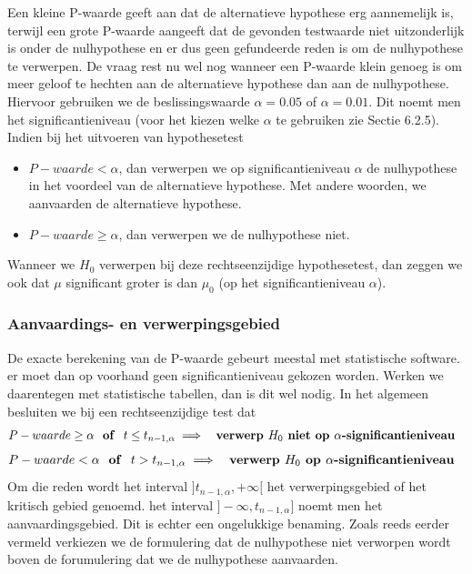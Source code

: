 \documentclass[titlepage]{article}
\numberwithin{equation}{section}
\begin{document}
Een kleine P-waarde geeft aan dat de alternatieve hypothese erg aannemelijk is, terwijl een grote P-waarde aangeeft dat de gevonden testwaarde niet uitzonderlijk is onder de nulhypothese en er dus geen gefundeerde reden is om de nulhypothese te verwerpen. De vraag rest nu wel nog wanneer een P-waarde klein genoeg is om meer geloof te hechten aan de alternatieve hypothese dan aan de nulhypothese. Hiervoor gebruiken we de beslissingswaarde $\alpha = 0.05$ of $\alpha = 0.01$. Dit noemt men het significantieniveau (voor het kiezen welke $\alpha$ te gebruiken zie Sectie 6.2.5). Indien bij het uitvoeren van hypothesetest
\begin{itemize}
	\item $P-waarde < \alpha$, dan verwerpen we op significantieniveau $\alpha$ de nulhypothese in het voordeel van de alternatieve hypothese. Met andere woorden, we aanvaarden de alternatieve hypothese.
	\item $P-waarde \geq \alpha$, dan verwerpen we de nulhypothese niet.
\end{itemize}
Wanneer we $H_0$ verwerpen bij deze rechtseenzijdige hypothesetest, dan zeggen we ook dat $\mu$ significant groter is dan $\mu_0$ (op het significantieniveau $\alpha$).
\subsubsection{Aanvaardings- en verwerpingsgebied}
De exacte berekening van de P-waarde gebeurt meestal met statistische software. er moet dan op voorhand geen significantieniveau gekozen worden. Werken we daarentegen met statistische tabellen, dan is dit wel nodig. In het algemeen besluiten we bij een rechtseenzijdige test dat
\begin{equation*}
	P-waarde \geq \alpha \text{ \textbf{ of } } t \leq t_{n-1, \alpha} \implies \text{ \textbf{ verwerp $H_0$ niet op $\alpha$-significantieniveau } }
\end{equation*}
\begin{equation*}
	P-waarde < \alpha \text{ \textbf{ of } } t > t_{n-1, \alpha} \implies \text{ \textbf{ verwerp $H_0$ op $\alpha$-significantieniveau } }
\end{equation*}
Om die reden wordt het interval $]t_{n-1, \alpha}, + \infty[$ het verwerpingsgebied of het kritisch gebied genoemd. het interval $]-\infty, t_{n-1, \alpha}]$ noemt men het aanvaardingsgebied. Dit is echter een ongelukkige benaming. Zoals reeds eerder vermeld verkiezen we de formulering dat de nulhypothese niet verworpen wordt boven de forumulering dat we de nulhypothese aanvaarden.
\end{document}
